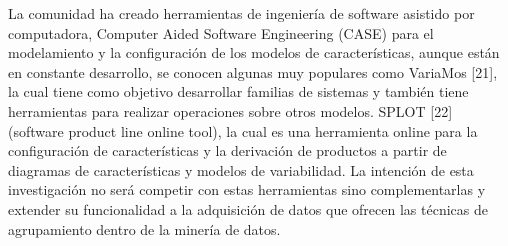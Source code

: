 La comunidad ha creado herramientas de ingeniería de software asistido por computadora, Computer Aided Software Engineering (CASE) para el modelamiento y la configuración de los modelos de características, aunque están en constante desarrollo, se conocen algunas muy populares como VariaMos [21], la cual tiene como objetivo desarrollar  familias de sistemas y también tiene herramientas para realizar operaciones sobre otros modelos. SPLOT [22] (software product line online tool), la cual es una herramienta online para la configuración de características y la derivación de productos a partir de diagramas de características y modelos de variabilidad. La intención de esta investigación no será competir con estas herramientas sino complementarlas y extender su funcionalidad a la adquisición de datos que ofrecen las técnicas de agrupamiento dentro de la minería de datos.

	
